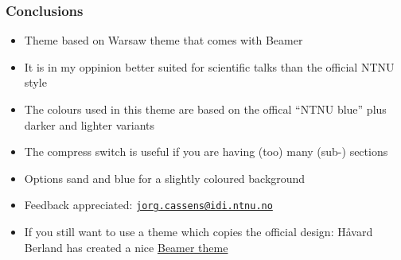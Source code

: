 \documentclass{beamer}
\begin{document}
\begin{frame}
  \frametitle{Conclusions}

  \begin{itemize}
    \item{Theme based on Warsaw theme that comes with Beamer}
    \item{It is in my oppinion better suited for scientific talks than the official NTNU style}
    \item{The colours used in this theme are based on the offical ``NTNU blue'' plus darker and lighter variants}
    \item{The compress switch is useful if you are having (too) many (sub-) sections}
    \item{Options sand and blue for a slightly coloured background}
    \item{Feedback appreciated: \href{mailto:jorg.cassens@idi.ntnu.no}{\texttt{jorg.cassens@idi.ntnu.no}}}
    \item{If you still want to use a theme which copies the official design: H\aa vard Berland has created a nice \href{http://www.math.ntnu.no/~berland/ntnubeamer/}{\alert{Beamer theme}}}
  \end{itemize}
\end{frame}
\end{document}
